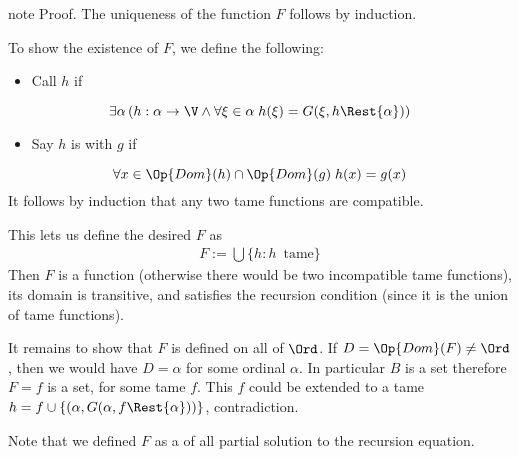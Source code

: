 \documentclass[letterpaper,10pt,english]{jupyterBook}
\begin{document}
\begin{sphinxadmonition}{note}
\sphinxAtStartPar
Proof. The uniqueness of the function \(F\) follows by induction.

\sphinxAtStartPar
To show the existence of \(F\), we define the following:
\begin{itemize}
\item {} 
\sphinxAtStartPar
Call \(h\)  if

\end{itemize}
\begin{equation*}
\exists \alpha \, (h: \alpha \to \V  \wedge \forall \xi \in \alpha \; h(\xi) = G(\xi, h \Rest{\alpha}))
\end{equation*}\begin{itemize}
\item {} 
\sphinxAtStartPar
Say \(h\) is  with \(g\) if

\end{itemize}
\begin{equation*} 
    \forall x \in \Op{Dom}(h) \cap \Op{Dom}(g) \; h(x) = g(x)
\end{equation*}
\sphinxAtStartPar
It follows by induction that any two tame functions are compatible.

\sphinxAtStartPar
This lets us define the desired \(F\) as
\begin{equation*}
\begin{split}
F := \bigcup \{h \colon h\, \text{ tame}\}
\end{split}
\end{equation*}
\sphinxAtStartPar
Then \(F\) is a function (otherwise there would be two incompatible tame functions), its domain is transitive, and satisfies the recursion condition (since it is the union of tame functions).

\sphinxAtStartPar
It remains to show that \(F\) is defined on all of \(\Ord\).
If \(D = \Op{Dom}(F) \neq \Ord\), then we would have \(D = \alpha\) for some ordinal \(\alpha\). In particular \(B\) is a set therefore \(F = f\) is a set, for some tame \(f\). This \(f\) could be extended to a tame \(h = f \cup \{(\alpha,G(\alpha,f \Rest{\alpha}))\}\), contradiction.
\end{sphinxadmonition}

\sphinxAtStartPar
Note that we defined \(F\)  as a  of all partial solution to the recursion equation.
\end{document}
